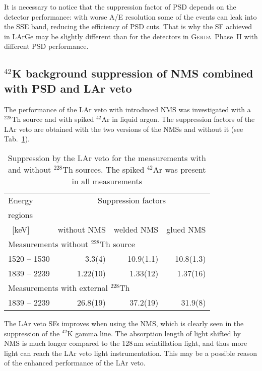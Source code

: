 \documentclass[twocolumn,epjc3]{svjour3}
\newcommand{\Gerda} {{\textsc{Gerda}\xspace}}
\newcommand{\LArGe} {{{LArGe}\xspace}}
\newcommand{\I}[2]{$^{#1}$#2}
\begin{document}
It is necessary to notice that the suppression factor of PSD depends on the detector performance: with worse A/E resolution some of the events can leak into the SSE band, reducing the efficiency of PSD cuts. That is why the SF achieved in \LArGe{} may be slightly different than for the detectors in \Gerda{}~Phase~II with different PSD performance.
%
\subsection{ \I{42}{K} background suppression of NMS combined with PSD and LAr veto}
\label{sec:invtot}
%

The performance of the LAr veto with introduced NMS was investigated with a \I{228}{Th} source and with spiked \I{42}{Ar} in liquid argon. The suppression factors of the LAr veto are obtained with the two versions of the NMSs and without it (see Tab.~\ref{tab:pmt_veto1}).
\begin{table}
  \begin{center}
    \caption{\label{tab:pmt_veto1}Suppression by the LAr veto for the measurements with and without \I{228}{Th} sources. The spiked \I{42}{Ar} was present in all measurements}
\begin{tabular}{lrrr} 
  \toprule
Energy & \multicolumn{3}{c}{Suppression factors} \\
regions & &  & \\
\ [keV] & without NMS & welded NMS &glued NMS \\
\hline
\multicolumn{4}{l}{Measurements without \(^{228}\)Th source} \\
1520 -- 1530 & 3.3(4) & 10.9(1.1) & 10.8(1.3)\\
1839 -- 2239 & 1.22(10) & 1.33(12) & 1.37(16) \\
\hline
\multicolumn{4}{l}{Measurements with external \(^{228}\)Th} \\
1839 -- 2239 & 26.8(19) & 37.2(19) & 31.9(8) \\
\bottomrule
\end{tabular}
  \end{center}
\end{table}
The LAr veto SFs improves when using the NMS, which is clearly seen in the suppression of the \I{42}{K} gamma line. The absorption length of light shifted by NMS is much longer compared to the 128\,nm scintillation light, and thus more light can reach the LAr veto light instrumentation. This may be a possible reason of the enhanced performance of the LAr veto.
\end{document}
